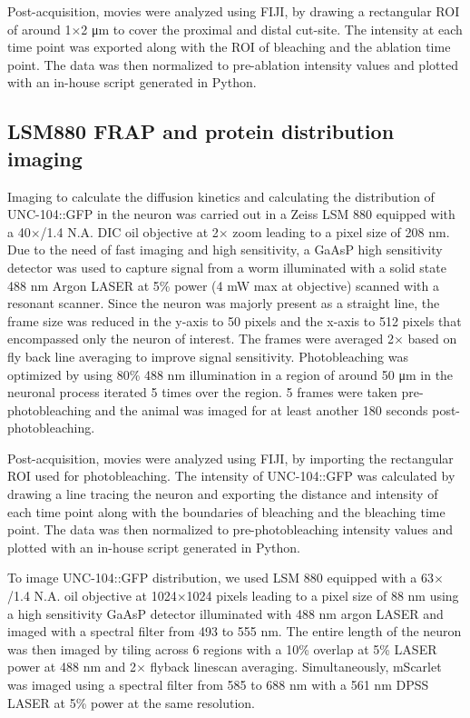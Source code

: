 Post-acquisition, movies were analyzed using FIJI, by drawing a rectangular ROI of around 1$\times$2 μm to cover the proximal and distal cut-site. The intensity at each time point was exported along with the ROI of bleaching and the ablation time point. The data was then normalized to pre-ablation intensity values and plotted with an in-house script generated in Python.

\subsection{LSM880 FRAP and protein distribution imaging}

Imaging to calculate the diffusion kinetics and calculating the distribution of UNC-104::GFP in the neuron was carried out in a Zeiss LSM 880 equipped with a 40$\times$/1.4 N.A. DIC oil objective at 2$\times$ zoom leading to a pixel size of 208 nm. Due to the need of fast imaging and high sensitivity, a GaAsP high sensitivity detector was used to capture signal from a worm illuminated with a solid state 488 nm Argon LASER at 5\% power (4 mW max at objective) scanned with a resonant scanner. Since the neuron was majorly present as a straight line, the frame size was reduced in the y-axis to 50 pixels and the x-axis to 512 pixels that encompassed only the neuron of interest. The frames were averaged 2$\times$ based on fly back line averaging to improve signal sensitivity. Photobleaching was optimized by using 80\% 488 nm illumination in a region of around 50 μm in the neuronal process iterated 5 times over the region. 5 frames were taken pre-photobleaching and the animal was imaged for at least another 180 seconds post-photobleaching.

Post-acquisition, movies were analyzed using FIJI, by importing the rectangular ROI used for photobleaching. The intensity of UNC-104::GFP was calculated by drawing a line tracing the neuron and exporting the distance and intensity of each time point along with the boundaries of bleaching and the bleaching time point. The data was then normalized to pre-photobleaching intensity values and plotted with an in-house script generated in Python.

To image UNC-104::GFP distribution, we used LSM 880 equipped with a 63$\times$/1.4 N.A. oil objective at 1024$\times$1024 pixels leading to a pixel size of 88 nm using a high sensitivity GaAsP detector illuminated with 488 nm argon LASER and imaged with a spectral filter from 493 to 555 nm. The entire length of the neuron was then imaged by tiling across 6 regions with a 10\% overlap at 5\% LASER power at 488 nm and 2$\times$ flyback linescan averaging. Simultaneously, mScarlet was imaged using a spectral filter from 585 to 688 nm with a 561 nm DPSS LASER at 5\% power at the same resolution.

